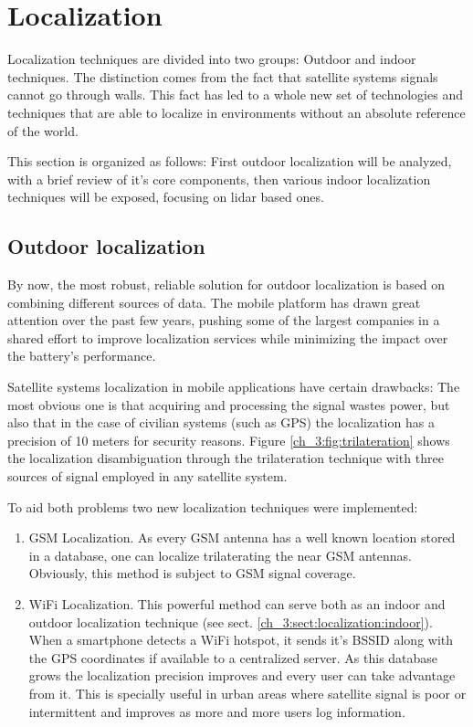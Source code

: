   \section{Localization}

    Localization techniques are divided into two groups: Outdoor and indoor techniques. The distinction comes from the fact that satellite systems signals cannot go through walls. This fact has led to a whole new set of technologies and techniques that are able to localize in environments without an absolute reference of the world.

    This section is organized as follows: First outdoor localization will be analyzed, with a brief review of it's core components, then various indoor localization techniques will be exposed, focusing on lidar based ones.

    \subsection{Outdoor localization} \label{ch_3:sect:localization:outdoor}

      By now, the most robust, reliable solution for outdoor localization is based on combining different sources of data. The mobile platform has drawn great attention over the past few years, pushing some of the largest companies in a shared effort to improve localization services while minimizing the impact over the battery's performance.

      Satellite systems localization in mobile applications have certain drawbacks: The most obvious one is that acquiring and processing the signal wastes power, but also that in the case of civilian systems (such as GPS) the localization has a precision of 10 meters for security reasons. Figure \ref{ch_3:fig:trilateration} shows the localization disambiguation through the trilateration technique with three sources of signal employed in any satellite system.

      To aid both problems two new localization techniques were implemented:
      \begin{enumerate}
        \item GSM Localization. As every GSM antenna has a well known location stored in a database, one can localize trilaterating the near GSM antennas. Obviously, this method is subject to GSM signal coverage.
        \item WiFi Localization. This powerful method can serve both as an indoor and outdoor localization technique (see sect. \ref{ch_3:sect:localization:indoor}). When a smartphone detects a WiFi hotspot, it sends it's BSSID along with the GPS coordinates if available to a centralized server. As this database grows the localization precision improves and every user can take advantage from it. This is specially useful in urban areas where satellite signal is poor or intermittent and improves as more and more users log information.
      \end{enumerate}

